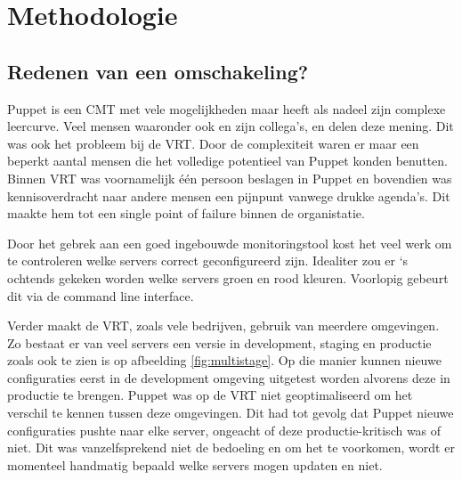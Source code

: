 
\chapter{Methodologie}
\label{ch:methodologie}


\section{Redenen van een omschakeling?}
\label{sec:methodologie-redenen-omschakeling}

Puppet is een CMT met vele mogelijkheden maar heeft als nadeel zijn complexe leercurve. Veel mensen waaronder ook \textcite{danAnsiblevsPuppet} en zijn collega's, \textcite{martinAnsiblevsPuppet} en \textcite{AliAnsiblevsPuppet} delen deze mening. Dit was ook het probleem bij de \gls{VRT}. Door de complexiteit waren er maar een beperkt aantal mensen die het volledige potentieel van Puppet konden benutten. Binnen \gls{VRT} was voornamelijk \'e\'en persoon beslagen in Puppet en bovendien was kennisoverdracht naar andere mensen een pijnpunt vanwege drukke agenda's. Dit maakte hem tot een single point of failure binnen de organistatie.

Door het gebrek aan een goed ingebouwde monitoringstool kost het veel werk om te controleren welke servers correct geconfigureerd zijn. Idealiter zou er  `s ochtends gekeken worden welke servers groen en rood kleuren. Voorlopig gebeurt dit via de command line interface.  

Verder maakt de \gls{VRT}, zoals vele bedrijven, gebruik van meerdere omgevingen. Zo bestaat er van veel servers een versie in development, staging en productie zoals ook te zien is op afbeelding \ref{fig:multistage}. Op die manier kunnen nieuwe configuraties eerst in de development omgeving uitgetest worden alvorens deze in productie te brengen. Puppet was op de \gls{VRT} niet geoptimaliseerd om het verschil te kennen tussen deze omgevingen. Dit had tot gevolg dat Puppet nieuwe configuraties pushte naar elke server, ongeacht of deze productie-kritisch was of niet. Dit was vanzelfsprekend niet de bedoeling en om het te voorkomen, wordt er momenteel handmatig bepaald welke servers mogen updaten en niet. 
 
